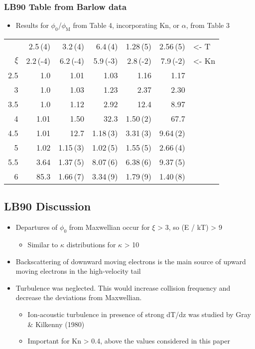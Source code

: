 \documentclass[11pt]{article}
\begin{document}
\subsubsection{LB90 Table from Barlow data}
\label{sec:orgheadline15}
\begin{itemize}
\item Results for \(\phi_{\text{0}}\)/\(\phi_{\text{M}}\) from Table 4, incorporating Kn, or \(\alpha\), from Table 3
\end{itemize}
\begin{center}
\label{tab:orgtable2}

\begin{tabular}{rrrrrrl}
 & 2.5\,(4) & 3.2\,(4) & 6.4\,(4) & 1.28\,(5) & 2.56\,(5) & <- T\\
\(\xi\) & 2.2\,(-4) & 6.2\,(-4) & 5.9\,(-3) & 2.8\,(-2) & 7.9\,(-2) & <- Kn\\
\hline
2.5 & 1.0 & 1.01 & 1.03 & 1.16 & 1.17 & \\
3 & 1.0 & 1.03 & 1.23 & 2.37 & 2.30 & \\
3.5 & 1.0 & 1.12 & 2.92 & 12.4 & 8.97 & \\
4 & 1.01 & 1.50 & 32.3 & 1.50\,(2) & 67.7 & \\
4.5 & 1.01 & 12.7 & 1.18\,(3) & 3.31\,(3) & 9.64\,(2) & \\
5 & 1.02 & 1.15\,(3) & 1.02\,(5) & 1.55\,(5) & 2.66\,(4) & \\
5.5 & 3.64 & 1.37\,(5) & 8.07\,(6) & 6.38\,(6) & 9.37\,(5) & \\
6 & 85.3 & 1.66\,(7) & 3.34\,(9) & 1.79\,(9) & 1.40\,(8) & \\
\end{tabular}
\end{center}
\subsection{LB90 Discussion}
\label{sec:orgheadline17}
\begin{itemize}
\item Departures of \(\phi_{\text{0}}\) from Maxwellian occur for \(\xi\) > 3, so (E / kT) > 9
\begin{itemize}
\item Similar to \(\kappa\) distributions for \(\kappa\) > 10
\end{itemize}
\item Backscattering of downward moving electrons is the main source of upward moving electrons in the high-velocity tail
\item Turbulence was neglected.  This would increase collision frequency and decrease the deviations from Maxwellian.
\begin{itemize}
\item Ion-acoustic turbulence in presence of strong dT/dz was studied by Gray \& Kilkenny (1980)
\item Important for Kn > 0.4, above the values considered in this paper
\end{itemize}
\end{itemize}
\end{document}
